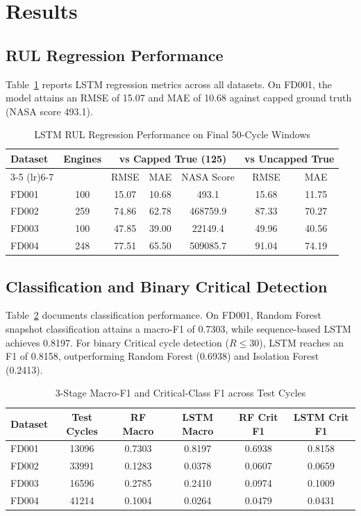 \documentclass[conference]{IEEEtran}
\begin{document}
\section{Results}
\subsection{RUL Regression Performance}
Table~\ref{tab:regression} reports LSTM regression metrics across all datasets. On FD001, the model attains an RMSE of 15.07 and MAE of 10.68 against capped ground truth (NASA score 493.1).

\begin{table}[htbp]
\caption{LSTM RUL Regression Performance on Final 50-Cycle Windows}
\label{tab:regression}
\centering
\begin{tabular}{lcccccc}
\toprule
Dataset & Engines & \multicolumn{3}{c}{vs Capped True (125)} & \multicolumn{2}{c}{vs Uncapped True} \\
\cmidrule(lr){3-5} \cmidrule(lr){6-7}
 & & RMSE & MAE & NASA Score & RMSE & MAE \\
\midrule
FD001 & 100 & 15.07 & 10.68 & 493.1 & 15.68 & 11.75 \\
FD002 & 259 & 74.86 & 62.78 & 468759.9 & 87.33 & 70.27 \\
FD003 & 100 & 47.85 & 39.00 & 22149.4 & 49.96 & 40.56 \\
FD004 & 248 & 77.51 & 65.50 & 509085.7 & 91.04 & 74.19 \\
\bottomrule
\end{tabular}
\end{table}

\subsection{Classification and Binary Critical Detection}
Table~\ref{tab:classification} documents classification performance. On FD001, Random Forest snapshot classification attains a macro-F1 of 0.7303, while sequence-based LSTM achieves 0.8197. For binary Critical cycle detection ($R \le 30$), LSTM reaches an F1 of 0.8158, outperforming Random Forest (0.6938) and Isolation Forest (0.2413).

\begin{table}[htbp]
\caption{3-Stage Macro-F1 and Critical-Class F1 across Test Cycles}
\label{tab:classification}
\centering
\begin{tabular}{lccccc}
\toprule
Dataset & Test Cycles & RF Macro & LSTM Macro & RF Crit F1 & LSTM Crit F1 \\
\midrule
FD001 & 13096 & 0.7303 & 0.8197 & 0.6938 & 0.8158 \\
FD002 & 33991 & 0.1283 & 0.0378 & 0.0607 & 0.0659 \\
FD003 & 16596 & 0.2785 & 0.2410 & 0.0974 & 0.1009 \\
FD004 & 41214 & 0.1004 & 0.0264 & 0.0479 & 0.0431 \\
\bottomrule
\end{tabular}
\end{table}
\end{document}
